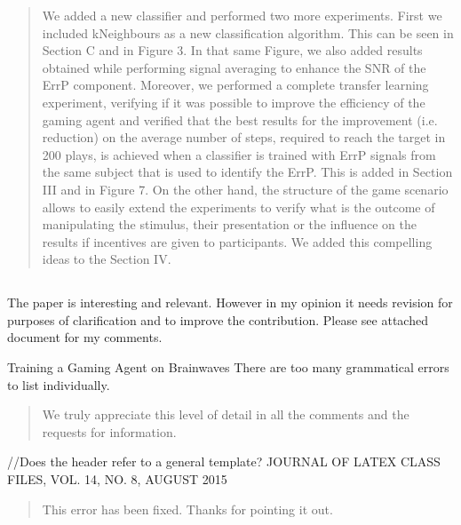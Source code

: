\documentclass[journal,onecolumn,12pt]{IEEEtran}
\begin{document}
\begin{quotation}
{\color{blue}
We added a new classifier and performed two more experiments.  First we included kNeighbours as a new classification algorithm.  This can be seen in Section C and in Figure 3.  In that same Figure, we also added results obtained while performing signal averaging to enhance the SNR of the ErrP component. Moreover, we performed a complete transfer learning experiment, verifying if it was possible to improve the efficiency of the gaming agent and verified that the best results for the improvement (i.e. reduction) on the average number of steps, required to reach the target in 200 plays, is achieved when a classifier is trained with ErrP signals from the same subject that is used to identify the ErrP.    This is added in Section III and in Figure 7.
On the other hand, the structure of the game scenario allows to easily extend the experiments to verify what is the outcome of manipulating the stimulus, their presentation or the influence on the results if incentives are given to participants.  We added this compelling ideas to the Section IV.
}
\end{quotation}

\subsection*{}
The paper is interesting and relevant. However in my opinion it needs revision for purposes of clarification and to improve the contribution.
Please see attached document for my comments.

Training a Gaming Agent on Brainwaves
There are too many grammatical errors to list individually.

\vspace{2em}
\begin{quotation}
{\color{blue}
We truly appreciate this level of detail in all the comments and the requests for information. 
}
\end{quotation}
\vspace{2em}

//Does the header refer to a general template?
JOURNAL OF LATEX CLASS FILES, VOL. 14, NO. 8, AUGUST 2015

\vspace{2em}
\begin{quotation}
{\color{blue}
This error has been fixed.  Thanks for pointing it out.
}
\end{quotation}
\vspace{2em}
\end{document}
